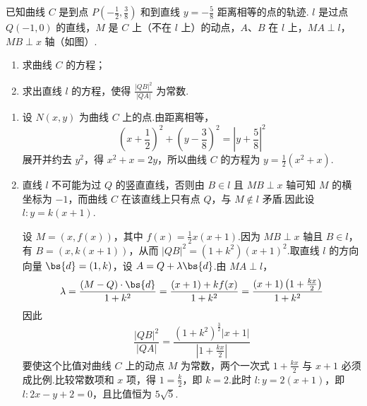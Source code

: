 \begin{problem}
已知曲线 \(C\) 是到点 \(P\left(-\frac{1}{2}, \frac{3}{8}\right)\) 和到直线 \(y = -\frac{5}{8}\) 距离相等的点的轨迹. \(l\) 是过点 \(Q(-1, 0)\) 的直线，\(M\) 是 \(C\) 上（不在 \(l\) 上）的动点，\(A\)、\(B\) 在 \(l\) 上，\(MA \perp l\)，\(MB \perp x\) 轴（如图）.

\begin{enumerate}
\item 求曲线 \(C\) 的方程；
\item 求出直线 \(l\) 的方程，使得 \(\frac{|QB|^2}{|QA|}\) 为常数.
\end{enumerate}


\begin{solution}
\begin{enumerate}
\item 设 \(N(x,y)\) 为曲线 \(C\) 上的点.由距离相等，
\[
\left(x+\frac12\right)^2+\left(y-\frac38\right)^2=\left|y+\frac58\right|^2
\]
展开并约去 \(y^2\)，得 \(x^2+x=2y\)，所以曲线 \(C\) 的方程为
\(y=\frac12(x^2+x)\).
\item 直线 \(l\) 不可能为过 \(Q\) 的竖直直线，否则由 \(B\in l\) 且 \(MB\perp x\) 轴可知 \(M\) 的横坐标为 \(-1\)，而曲线 \(C\) 在该直线上只有点 \(Q\)，与 \(M\notin l\) 矛盾.因此设
\(l:y=k(x+1)\).

设 \(M=(x,f(x))\)，其中 \(f(x)=\frac12x(x+1)\).因为 \(MB\perp x\) 轴且 \(B\in l\)，有
\(B=(x,k(x+1))\)，从而 \(|QB|^2=(1+k^2)(x+1)^2\).取直线 \(l\) 的方向向量 \(\bs{d}=(1,k)\)，设
\(A=Q+\lambda\bs{d}\).由 \(MA\perp l\)，
\[
\lambda=\frac{(M-Q)\cdot\bs{d}}{1+k^2}
 =\frac{(x+1)+kf(x)}{1+k^2}
 =\frac{(x+1)\left(1+\frac{kx}{2}\right)}{1+k^2}
\]
因此
\[
\frac{|QB|^2}{|QA|}=\frac{(1+k^2)^{\frac{3}{2}}|x+1|}{\left|1+\frac{kx}{2}\right|}
\]
要使这个比值对曲线 \(C\) 上的动点 \(M\) 为常数，两个一次式
\(1+\frac{kx}{2}\) 与 \(x+1\) 必须成比例.比较常数项和 \(x\) 项，得
\(1=\frac{k}{2}\)，即 \(k=2\).此时 \(l:y=2(x+1)\)，即
\(l:2x-y+2=0\)，且比值恒为 \(5\sqrt5\).
\end{enumerate}
\end{solution}
\end{problem}

